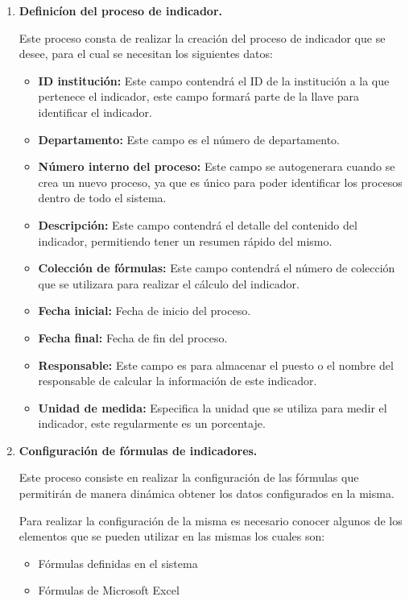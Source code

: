 			    \begin{enumerate}[1.]
		    		\item \textbf{Definic\'ion del proceso de indicador.}

		    			Este proceso consta de realizar la creaci\'on del proceso de indicador que se desee, para el cual se necesitan los siguientes datos:
		    			\begin{itemize}
		    				\item \textbf{ID instituci\'on:} Este campo contendr\'a el ID de la instituci\'on a la que pertenece el indicador, este campo formar\'a parte de la llave para identificar el indicador.
		    				\item \textbf{Departamento:} Este campo es el n\'umero de departamento.
		    				\item \textbf{N\'umero interno del proceso:} Este campo se autogenerara cuando se crea un nuevo proceso, ya que es \'unico para poder identificar los procesos dentro de todo el sistema.
		    				\item \textbf{Descripci\'on:} Este campo contendr\'a el detalle del contenido del indicador, permitiendo tener un resumen r\'apido del mismo.
		    				\item \textbf{Colecci\'on de f\'ormulas:} Este campo contendr\'a el n\'umero de colecci\'on que se utilizara para realizar el c\'alculo del indicador.
		    				\item \textbf{Fecha inicial:} Fecha de inicio del proceso.
		    				\item \textbf{Fecha final:} Fecha de fin del proceso.
		    				\item \textbf{Responsable:} Este campo es para almacenar el puesto o el nombre del responsable de calcular la informaci\'on de este indicador.
		    				\item \textbf{Unidad de medida:} Especifica la unidad que se utiliza para medir el indicador, este regularmente es un porcentaje.
		    			\end{itemize}

		    		\item \textbf{Configuraci\'on de f\'ormulas de indicadores.}

		    			Este proceso consiste en realizar la configuraci\'on de las f\'ormulas que permitir\'an de manera din\'amica obtener los datos configurados en la misma.

						Para realizar la configuraci\'on de la misma es necesario conocer algunos de los elementos que se pueden utilizar en las mismas los cuales son:
						\begin{itemize}
							\item F\'ormulas definidas en el sistema
							\item F\'ormulas de  Microsoft Excel
						\end{itemize}


\end{enumerate}
